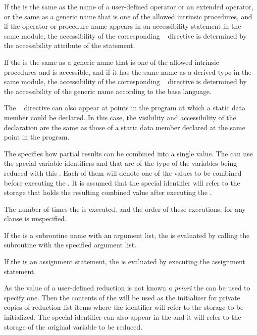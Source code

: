 \fortranspecificstart
If the  is the same as the name of a user-defined operator or an extended operator, or the same as a generic name that is one of the allowed intrinsic procedures, and if the operator or procedure name appears in an accessibility statement in the same module, the accessibility of the corresponding ~ directive is determined by the accessibility attribute of the statement.

If the  is the same as a generic name that is one of the allowed intrinsic procedures and is accessible, and if it has the same name as a derived type in the same module, the accessibility of the corresponding ~ directive is determined by the accessibility of the generic name according to the base language.
\fortranspecificend

\cppspecificstart
The ~ directive can also appear at points in the program at which 
a static data member could be declared. In this case, the visibility and accessibility of 
the declaration are the same as those of a static data member declared at the same point 
in the program.
\cppspecificend

The  specifies how partial results can be combined into a single value. The 
 can use the special variable identifiers  and  that are of the 
type of the variables being reduced with this . Each of them will 
denote one of the values to be combined before executing the . It is assumed 
that the special  identifier will refer to the storage that holds the resulting 
combined value after executing the .

The number of times the  is executed, and the order of these executions, for 
any  clause is unspecified.

\fortranspecificstart
If the  is a subroutine name with an argument list, the  is evaluated by 
calling the subroutine with the specified argument list.

If the  is an assignment statement, the  is evaluated by executing the 
assignment statement.
\fortranspecificend

As the  value of a user-defined reduction is not known \emph{a priori} the 
 can be used to specify one. Then the contents of the  
will be used as the initializer for private copies of reduction list items where the 
 identifier will refer to the storage to be initialized. The special identifier 
 can also appear in the  and it will refer to the storage of the 
original variable to be reduced.

